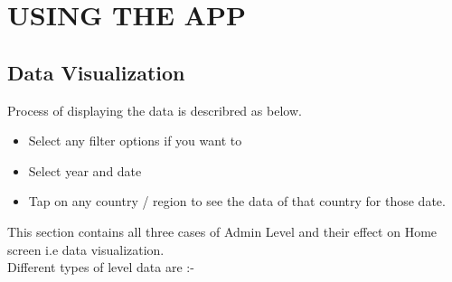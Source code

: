 \newpage

\section{USING THE APP}

\subsection{Data Visualization}



Process of displaying the data is describred as below.

\begin{itemize}
    \item Select any filter options if you want to
    \item Select year and date
    \item Tap on any country / region to see the data of that country for those date. \\
\end{itemize}

This section contains all three cases of Admin Level and their effect on Home screen i.e data visualization. \\

Different types of level data are :-

